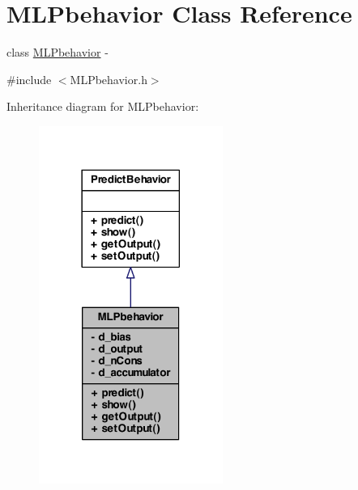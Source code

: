 \hypertarget{class_m_l_pbehavior}{
\section{MLPbehavior Class Reference}
\label{class_m_l_pbehavior}
}


class \hyperlink{class_m_l_pbehavior}{MLPbehavior} -\/  




{\ttfamily \#include $<$MLPbehavior.h$>$}



Inheritance diagram for MLPbehavior:
\nopagebreak
\begin{figure}[H]
\begin{center}
\leavevmode
\includegraphics[width=170pt]{class_m_l_pbehavior__inherit__graph}
\end{center}
\end{figure}



